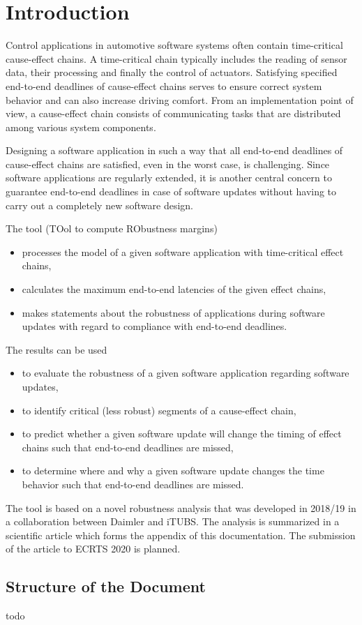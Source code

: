\section{Introduction}
Control applications in automotive software systems often contain time-critical cause-effect chains.  
A time-critical chain typically includes the reading of sensor data, their processing and finally the control of actuators.  
Satisfying specified end-to-end deadlines of cause-effect  chains serves to ensure correct system behavior and can also increase driving comfort.
From an implementation point of view, a cause-effect chain consists of communicating tasks that are distributed among various system components. 
\smallskip

Designing a software application in such a way that all end-to-end deadlines of cause-effect chains are satisfied, even in the worst case, is challenging. 
Since software applications are regularly extended, it is another central concern to guarantee end-to-end deadlines in case of software updates without having to carry out a completely new software design. 


The tool \Tool (TOol to compute RObustness margins)
\begin{itemize}
	\item processes the model of a given software application with time-critical effect chains,
	\item calculates the maximum end-to-end latencies of the given effect chains,
	\item makes statements about the robustness of applications during software updates with regard to compliance with end-to-end deadlines.
\end{itemize}
\bigskip

\noindent
The results can be used
\begin{itemize}
	\item to evaluate the robustness of a given software application regarding software updates, 
	\item to identify critical (less robust) segments of a cause-effect chain,
	\item to predict whether a given software update will change the timing of effect chains such that end-to-end deadlines are missed,
	\item to determine where and why a given software update changes the time behavior such that end-to-end deadlines are missed.
\end{itemize}
\bigskip

\noindent
The tool \Tool is based on a novel robustness analysis that was developed in 2018/19 in a collaboration between Daimler and iTUBS.
The analysis is summarized in a scientific article which forms the appendix of this documentation.
The submission of the article to ECRTS 2020 is planned.

\subsection{Structure of the Document}
\textcolor[rgb]{0,0,1}{todo}